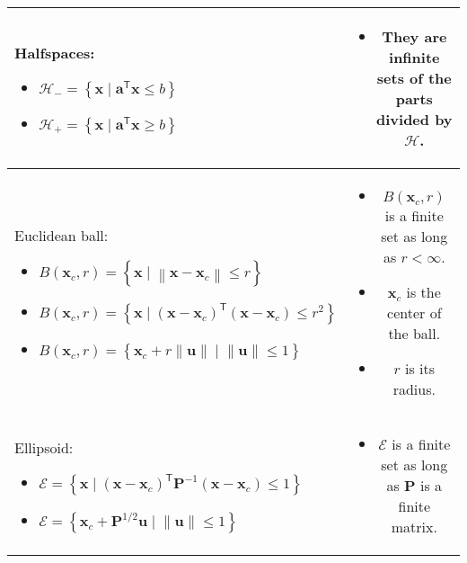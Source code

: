 \documentclass{article}
\newcommand{\trans}{\mathsf{T}}
\newcommand{\norm}[1]{\left\lVert#1\right\rVert}
\begin{document}
\begin{table}[ht!]
\begin{tabularx}{\textwidth}{|A|C|}
\hline
Halfspaces:
\begin{itemize}[leftmargin=*]
    \item \(\mathcal{H}_{-} = \left\{ \mathbf{x} \mid \mathbf{a}^\trans \mathbf{x} \leq b \right\}\)
    \item \(\mathcal{H}_{+} = \left\{ \mathbf{x} \mid \mathbf{a}^\trans \mathbf{x} \geq b \right\}\)
\end{itemize} & \vspace{-3.5ex}
\begin{itemize}[leftmargin=*]
    \item They are infinite sets of the parts divided by \(\mathcal{H}\).
\end{itemize}\\
\hline
Euclidean ball:
\begin{itemize}[leftmargin=*]
    \item \(B(\mathbf{x}_c, r) = \left\{ \mathbf{x} \mid \norm{\mathbf{x}-\mathbf{x}_c} \leq r \right\}\)
    \item \(B(\mathbf{x}_c, r) = \left\{ \mathbf{x} \mid \left( \mathbf{x}-\mathbf{x}_c \right)^\trans \left( \mathbf{x}-\mathbf{x}_c \right) \leq r^2 \right\}\)
    \item \(B(\mathbf{x}_c, r) = \left\{ \mathbf{x}_c + r \norm{\mathbf{u}} \mid \norm{\mathbf{u}} \leq 1 \right\}\)
\end{itemize} & \vspace{-3.5ex}
\begin{itemize}[leftmargin=*]
    \item \(B(\mathbf{x}_c, r)\) is a finite set as long as \(r < \infty\).
    \item \(\mathbf{x}_c\) is the center of the ball.
    \item \(r\) is its radius.
\end{itemize}\\
\hline
Ellipsoid:
\begin{itemize}[leftmargin=*]
    \item \(\mathcal{E} = \left\{ \mathbf{x} \mid (\mathbf{x}-\mathbf{x}_c)^\trans\mathbf{P}^{-1}(\mathbf{x}-\mathbf{x}_c) \leq 1 \right\}\)
    \item \(\mathcal{E} = \left\{ \mathbf{x}_{c} + \mathbf{P}^{1/2}\mathbf{u} \mid \norm{\mathbf{u}} \leq 1 \right\}\)
\end{itemize} & \vspace{-3.5ex}
\begin{itemize}[leftmargin=*]
    \item \(\mathcal{E}\) is a finite set as long as \(\mathbf{P}\) is a finite matrix.

\end{itemize}
\end{tabularx}
\end{table}
\end{document}
